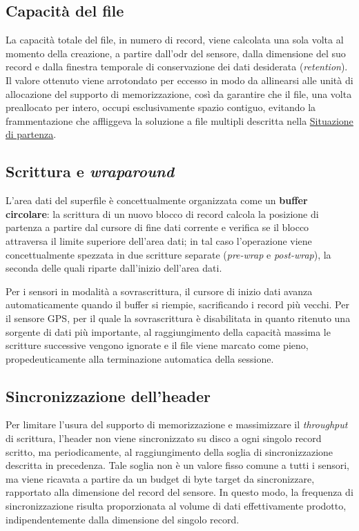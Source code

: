 \subsection{Capacità del file} \label{subsec:capacita_superfile}

La capacità totale del file, in numero di record, viene calcolata una sola volta al momento della creazione, a partire dall'\gls{odr} del sensore, 
dalla dimensione del suo record e dalla finestra temporale di conservazione dei dati desiderata (\emph{retention}).
Il valore ottenuto viene arrotondato per eccesso in modo da allinearsi alle unità di allocazione del supporto di memorizzazione, così da garantire
che il file, una volta preallocato per intero, occupi esclusivamente spazio contiguo, evitando la frammentazione che affliggeva la soluzione a
file multipli descritta nella \hyperref[sec:situazione-partenza]{Situazione di partenza}.

\subsection{Scrittura e \textit{wraparound}}

L'area dati del superfile è concettualmente organizzata come un \textbf{buffer circolare}: la scrittura di un nuovo blocco di record calcola la
posizione di partenza a partire dal cursore di fine dati corrente e verifica se il blocco attraversa il limite superiore dell'area dati; in tal caso
l'operazione viene concettualmente spezzata in due scritture separate (\emph{pre-wrap} e \emph{post-wrap}), la seconda delle quali riparte dall'inizio
dell'area dati.

Per i sensori in modalità a sovrascrittura, il cursore di inizio dati avanza automaticamente quando il buffer si riempie, sacrificando
i record più vecchi. Per il sensore GPS, per il quale la sovrascrittura è disabilitata in quanto ritenuto una sorgente di dati più importante, 
al raggiungimento della capacità massima le scritture successive vengono ignorate e il file viene marcato come pieno, propedeuticamente alla
terminazione automatica della sessione.

\subsection{Sincronizzazione dell'header} \label{subsec:sincronizzazione_header}

Per limitare l'usura del supporto di memorizzazione e massimizzare il \textit{throughput} di scrittura, l'header non viene sincronizzato su disco 
a ogni singolo record scritto, ma periodicamente, al raggiungimento della soglia di sincronizzazione descritta in precedenza. Tale soglia non è un 
valore fisso comune a tutti i sensori, ma viene ricavata a partire da un budget di byte target da sincronizzare, rapportato alla dimensione del 
record del sensore. In questo modo, la frequenza di sincronizzazione risulta proporzionata al volume di dati effettivamente prodotto, indipendentemente 
dalla dimensione del singolo record.

